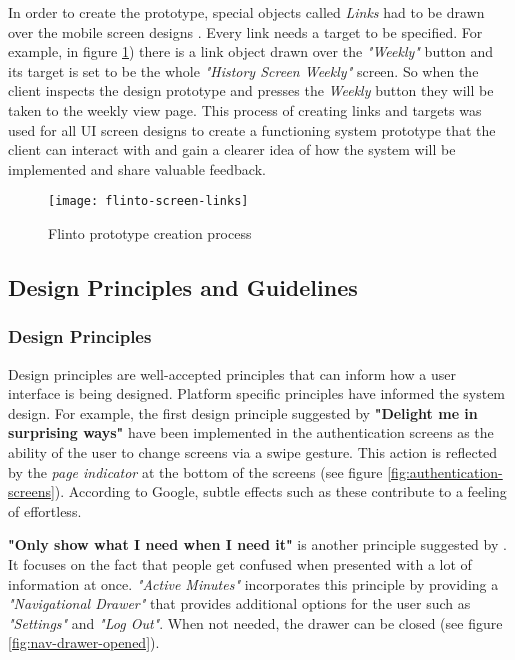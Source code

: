         In order to create the prototype, special objects called \textit{Links} had to be drawn over the mobile screen designs . Every link needs a target to be specified. For example, in figure \ref{fig:flinto_prototype}) there is a link object drawn over the \textit{"Weekly"} button and its target is set to be the whole \textit{"History Screen Weekly"} screen. So when the client inspects the design prototype and presses the \textit{Weekly} button they will be taken to the weekly view page. This process of creating links and targets was used for all UI screen designs to create a functioning system prototype that the client can interact with and gain a clearer idea of how the system will be implemented and share valuable feedback.
        
        \begin{figure}[ht]
            \centering
            \texttt{[image: flinto-screen-links]}
            \caption{Flinto prototype creation process}
            \label{fig:flinto_prototype}
        \end{figure}
        
        
        \subsection{Design Principles and Guidelines}
        
        \subsubsection{Design Principles}
        Design principles are well-accepted principles that can inform how a user interface is being designed. Platform specific principles have informed the system design. For example, the first design principle suggested by \citet{google2017b} \textbf{"Delight me in surprising ways"} have been implemented in the authentication screens as the ability of the user to change screens via a swipe gesture. This action is reflected by the \textit{page indicator} at the bottom of the screens (see figure \ref{fig:authentication-screens}). According to Google, subtle effects such as these contribute to a feeling of effortless. 
        
        \textbf{"Only show what I need when I need it"} is another principle suggested by \citet{google2017b}. It focuses on the fact that people get confused when presented with a lot of information at once. \textit{"Active Minutes"} incorporates this principle by providing a \textit{"Navigational Drawer"} that provides additional options for the user such as \textit{"Settings"} and \textit{"Log Out"}. When not needed, the drawer can be closed (see figure \ref{fig:nav-drawer-opened}). 
        
